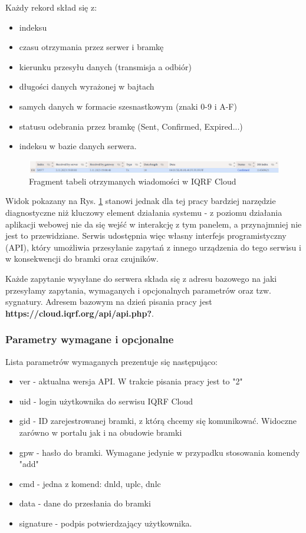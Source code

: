 Każdy rekord skład się z:
\begin{itemize}
    \item indeksu 
    \item czasu otrzymania przez serwer i bramkę
    \item kierunku przesyłu danych (transmisja a odbiór)
    \item długości danych wyrażonej w bajtach 
    \item samych danych w formacie szesnastkowym (znaki 0-9 i A-F)
    \item statusu odebrania przez bramkę (Sent, Confirmed, Expired...)
    \item indeksu w bazie danych serwera.
\end{itemize}

\begin{figure}[H]
    \includegraphics[width=\textwidth]{zdj/cloud-records.png}
    \caption{Fragment tabeli otrzymanych wiadomości w IQRF Cloud}
    \label{records-frag}
\end{figure}

Widok pokazany na Rys. \ref{records-frag} stanowi jednak dla tej pracy bardziej narzędzie diagnostyczne niż kluczowy element działania systemu - z poziomu działania aplikacji
webowej nie da się wejść w interakcję z tym panelem, a przynajmniej nie jest to przewidziane. Serwis udostępnia więc własny interfejs 
programistyczny (API), który umożliwia przesyłanie zapytań z innego urządzenia do tego serwisu i w konsekwencji do bramki oraz czujników.

Każde zapytanie wysyłane do serwera składa się z adresu bazowego na jaki przesyłamy zapytania, wymaganych i opcjonalnych parametrów oraz tzw. 
sygnatury. Adresem bazowym na dzień pisania pracy jest \textbf{https://cloud.iqrf.org/api/api.php?}.

\subsubsection{Parametry wymagane i opcjonalne}

Lista parametrów wymaganych prezentuje się następująco:

\begin{itemize}
    \item ver - aktualna wersja API. W trakcie pisania pracy jest to "2" 
    \item uid - login użytkownika do serwisu IQRF Cloud
    \item gid - ID zarejestrowanej bramki, z którą chcemy się komunikować. Widoczne zarówno w portalu jak i na obudowie bramki
    \item gpw - hasło do bramki. Wymagane jedynie w przypadku stosowania komendy "add"
    \item cmd - jedna z komend: dnld, uplc, dnlc
    \item data - dane do przesłania do bramki
    \item signature - podpis potwierdzający użytkownika.
\end{itemize}

